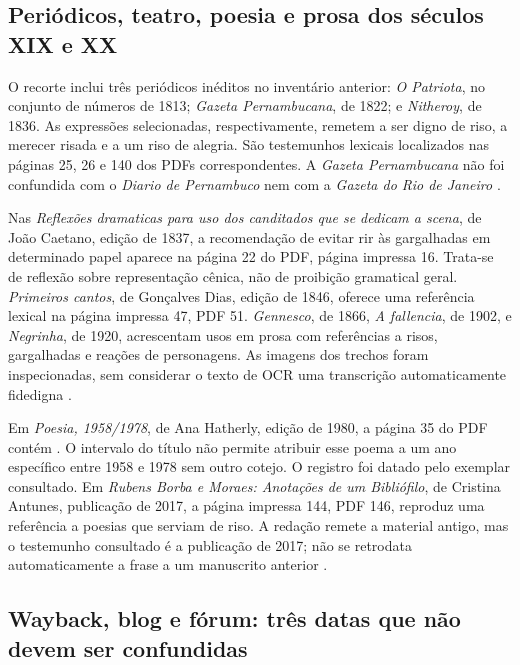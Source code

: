 \subsection{Periódicos, teatro, poesia e prosa dos séculos XIX e XX}

O recorte inclui três periódicos inéditos no inventário anterior: \textit{O Patriota}, no conjunto de números de 1813; \textit{Gazeta Pernambucana}, de 1822; e \textit{Nitheroy}, de 1836. As expressões selecionadas, respectivamente, remetem a ser digno de riso, a merecer risada e a um riso de alegria. São testemunhos lexicais localizados nas páginas 25, 26 e 140 dos PDFs correspondentes. A \textit{Gazeta Pernambucana} não foi confundida com o \textit{Diario de Pernambuco} nem com a \textit{Gazeta do Rio de Janeiro} \cite{r4opatriota,r4gazetapernambucana,r4nitheroy}.

Nas \textit{Reflexões dramaticas para uso dos canditados que se dedicam a scena}, de João Caetano, edição de 1837, a recomendação de evitar rir às gargalhadas em determinado papel aparece na página 22 do PDF, página impressa 16. Trata-se de reflexão sobre representação cênica, não de proibição gramatical geral. \textit{Primeiros cantos}, de Gonçalves Dias, edição de 1846, oferece uma referência lexical na página impressa 47, PDF 51. \textit{Gennesco}, de 1866, \textit{A fallencia}, de 1902, e \textit{Negrinha}, de 1920, acrescentam usos em prosa com referências a risos, gargalhadas e reações de personagens. As imagens dos trechos foram inspecionadas, sem considerar o texto de OCR uma transcrição automaticamente fidedigna \cite{r4reflexoesdramaticas,r4primeiroscantos,r4gennesco,r4afallencia,r4negrinha}.

Em \textit{Poesia, 1958/1978}, de Ana Hatherly, edição de 1980, a página 35 do PDF contém . O intervalo do título não permite atribuir esse poema a um ano específico entre 1958 e 1978 sem outro cotejo. O registro foi datado pelo exemplar consultado. Em \textit{Rubens Borba e Moraes: Anotações de um Bibliófilo}, de Cristina Antunes, publicação de 2017, a página impressa 144, PDF 146, reproduz uma referência a poesias que serviam de riso. A redação remete a material antigo, mas o testemunho consultado é a publicação de 2017; não se retrodata automaticamente a frase a um manuscrito anterior \cite{r4poesia19581978,r4rubensborbamoraesanotacoesbibliofilo}.

\subsection{Wayback, blog e fórum: três datas que não devem ser confundidas}

